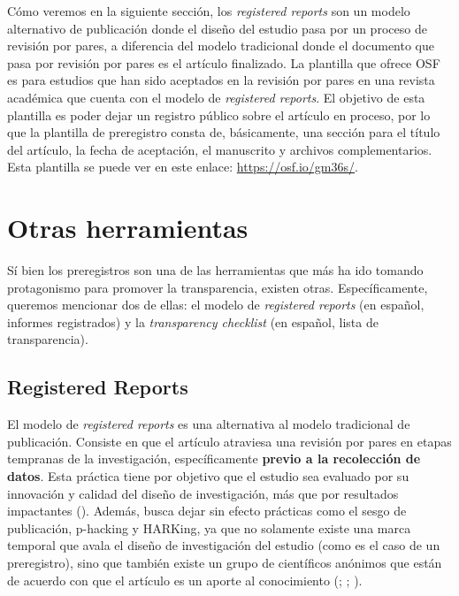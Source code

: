 \documentclass[
  spanish,
  a4paper,
  oneside]{scrbook}
\begin{document}
Cómo veremos en la siguiente sección, los \emph{registered reports} son
un modelo alternativo de publicación donde el diseño del estudio pasa
por un proceso de revisión por pares, a diferencia del modelo
tradicional donde el documento que pasa por revisión por pares es el
artículo finalizado. La plantilla que ofrece OSF es para estudios que
han sido aceptados en la revisión por pares en una revista académica que
cuenta con el modelo de \emph{registered reports}. El objetivo de esta
plantilla es poder dejar un registro público sobre el artículo en
proceso, por lo que la plantilla de preregistro consta de, básicamente,
una sección para el título del artículo, la fecha de aceptación, el
manuscrito y archivos complementarios. Esta plantilla se puede ver en
este enlace: \url{https://osf.io/gm36s/}.

\section{Otras herramientas}\label{otras-herramientas}

Sí bien los preregistros son una de las herramientas que más ha ido
tomando protagonismo para promover la transparencia, existen otras.
Específicamente, queremos mencionar dos de ellas: el modelo de
\emph{registered reports} (en español, informes registrados) y la
\emph{transparency checklist} (en español, lista de transparencia).

\subsection{Registered Reports}\label{registered-reports}

El modelo de \emph{registered reports} es una alternativa al modelo
tradicional de publicación. Consiste en que el artículo atraviesa una
revisión por pares en etapas tempranas de la investigación,
específicamente \textbf{previo a la recolección de datos}. Esta práctica
tiene por objetivo que el estudio sea evaluado por su innovación y
calidad del diseño de investigación, más que por resultados impactantes
(). Además,
busca dejar sin efecto prácticas como el sesgo de publicación, p-hacking
y HARKing, ya que no solamente existe una marca temporal que avala el
diseño de investigación del estudio (como es el caso de un preregistro),
sino que también existe un grupo de científicos anónimos que están de
acuerdo con que el artículo es un aporte al conocimiento
(;
;
).
\end{document}
